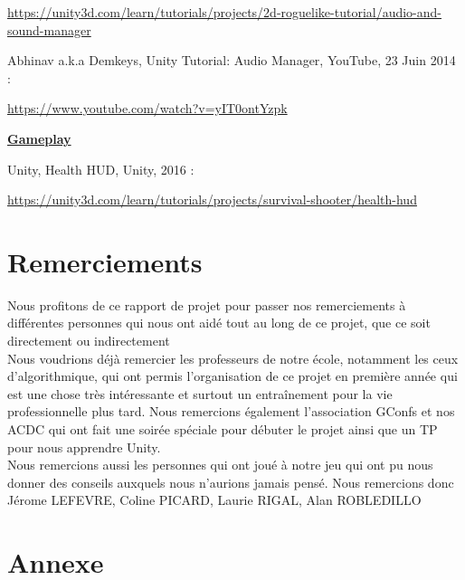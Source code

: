 \documentclass[a4paper , 12pt]{article}
\begin{document}
\url{https://unity3d.com/learn/tutorials/projects/2d-roguelike-tutorial/audio-and-sound-manager}

\quad

Abhinav a.k.a Demkeys, Unity Tutorial: Audio Manager, YouTube, 23 Juin 2014 :


\url{https://www.youtube.com/watch?v=yIT0ontYzpk}

\quad

\underline{\textbf{Gameplay}}

Unity, Health HUD, Unity, 2016 :


\url{https://unity3d.com/learn/tutorials/projects/survival-shooter/health-hud}

\quad

\newpage

\section{Remerciements}

\quad

Nous profitons de ce rapport de projet pour passer nos remerciements à différentes personnes qui nous ont aidé tout au long de ce projet, que ce soit directement ou indirectement\\

Nous voudrions déjà remercier les professeurs de notre école, notamment les ceux d’algorithmique, qui ont permis l’organisation de ce projet en première année qui est une chose très intéressante et surtout un entraînement pour la vie professionnelle plus tard.
Nous remercions également l’association GConfs et nos ACDC qui ont fait une soirée spéciale pour débuter le projet ainsi que un TP pour nous apprendre Unity.\\

Nous remercions aussi les personnes qui ont joué à notre jeu qui ont pu nous donner des conseils auxquels nous n’aurions jamais pensé. Nous remercions donc 
Jérome LEFEVRE, Coline PICARD, Laurie RIGAL, Alan ROBLEDILLO

\quad

\newpage

\section{Annexe}
\end{document}
